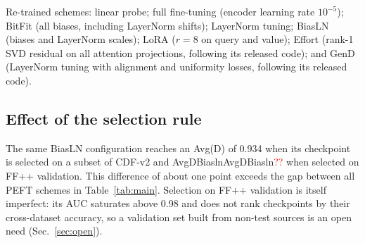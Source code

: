 \documentclass[fonts]{icst}
\newcommand{\num}[1]{\ifcsname #1\endcsname\csname #1\endcsname\else\textcolor{red}{??}\fi}
\begin{document}
Re-trained schemes: linear probe; full fine-tuning (encoder learning rate $10^{-5}$); BitFit (all biases, including LayerNorm shifts); LayerNorm tuning; BiasLN (biases and LayerNorm scales); LoRA ($r{=}8$ on query and value); Effort (rank-1 SVD residual on all attention projections, following its released code); and GenD (LayerNorm tuning with alignment and uniformity losses, following its released code).

\subsection{Effect of the selection rule}
\label{sec:selection}
The same BiasLN configuration reaches an Avg(D) of 0.934 when its checkpoint is selected on a subset of CDF-v2 and \num{AvgDBiasln} when selected on FF++ validation. This difference of about one point exceeds the gap between all PEFT schemes in Table~\ref{tab:main}. Selection on FF++ validation is itself imperfect: its AUC saturates above 0.98 and does not rank checkpoints by their cross-dataset accuracy, so a validation set built from non-test sources is an open need (Sec.~\ref{sec:open}).

\begin{table}[!t]
\centering
\caption{Video AUC of re-trained schemes under one protocol (FF++ c23 training, checkpoint selected on FF++ validation). Avg(D) and Avg(M) are mean $\pm$ std over $n$ seeds; per-dataset values are seed means. Bold: best; shaded: second best.}
\label{tab:main}
\resizebox{\textwidth}{!}{}
\vspace{3mm}
\caption{Ablation of selective and low-rank schemes and of $L_2$ normalization before the classifier (same protocol). Bold: best; shaded: second best.}
\label{tab:ablation}
\resizebox{0.85\textwidth}{!}{}
\end{table}
\end{document}

